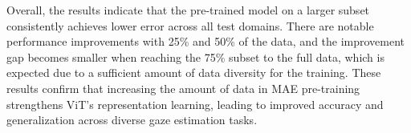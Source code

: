 Overall, the results indicate that the pre-trained model on a larger subset consistently achieves lower error across all test domains.
There are notable performance improvements with 25\% and 50\% of the data, and the improvement gap becomes smaller when reaching the 75\% subset to the full data, which is expected due to a sufficient amount of data diversity for the training.
These results confirm that increasing the amount of data in MAE pre-training strengthens ViT’s representation learning, leading to improved accuracy and generalization across diverse gaze estimation tasks.



\begin{table}[t]
    \centering
    \caption{
    Comparison of different formats of the input data in the leave-one-dataset-out evaluation setting. Each column shows the results on each test dataset. For fair compassion with FaRL-B~\cite{zheng2022general}, we use the ViT-B backbone (\methodname-B). 
    \textit{Real} stands for the combination of our real datasets CelebV-Text, VFHQ, and VGGFace2.
    }
\label{table:ablation_data_format}
\end{table}



